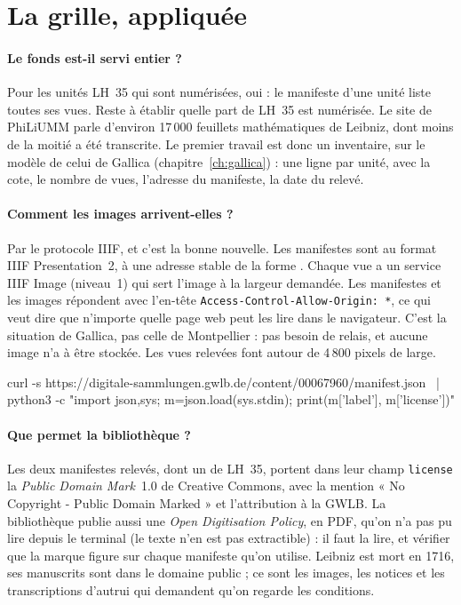 \section{La grille, appliquée}

\paragraph{Le fonds est-il servi entier ?} Pour les unités LH~35 qui sont numérisées, oui :
le manifeste d'une unité liste toutes ses vues. Reste à établir quelle part de LH~35 est
numérisée. Le site de PhiLiUMM parle d'environ 17\,000 feuillets mathématiques de Leibniz,
dont moins de la moitié a été transcrite. Le premier travail est donc un inventaire, sur le
modèle de celui de Gallica (chapitre~\ref{ch:gallica}) : une ligne par unité, avec la cote,
le nombre de vues, l'adresse du manifeste, la date du relevé.

\paragraph{Comment les images arrivent-elles ?} Par le protocole IIIF, et c'est la bonne
nouvelle. Les manifestes sont au format IIIF Presentation~2, à une adresse stable de la
forme . Chaque
vue a un service IIIF Image (niveau~1) qui sert l'image à la largeur demandée. Les
manifestes et les images répondent avec l'en-tête \texttt{Access-Control-Allow-Origin: *},
ce qui veut dire que n'importe quelle page web peut les lire dans le navigateur. C'est la
situation de Gallica, pas celle de Montpellier : pas besoin de relais, et aucune image n'a
à être stockée. Les vues relevées font autour de 4\,800 pixels de large.

\begin{terminal}
curl -s https://digitale-sammlungen.gwlb.de/content/00067960/manifest.json \
  | python3 -c "import json,sys; m=json.load(sys.stdin); print(m['label'], m['license'])"
\end{terminal}

\paragraph{Que permet la bibliothèque ?} Les deux manifestes relevés, dont un de LH~35,
portent dans leur champ \texttt{license} la \emph{Public Domain Mark}~1.0 de Creative
Commons, avec la mention « No Copyright - Public Domain Marked » et l'attribution à la GWLB.
La bibliothèque publie aussi une \emph{Open Digitisation Policy}, en PDF, qu'on n'a pas
pu lire depuis le terminal (le texte n'en est pas extractible) : il faut la lire, et
vérifier que la marque figure sur chaque manifeste qu'on utilise. Leibniz est mort en
1716, ses manuscrits sont dans le domaine public ; ce sont les images, les notices et les
transcriptions d'autrui qui demandent qu'on regarde les conditions.

